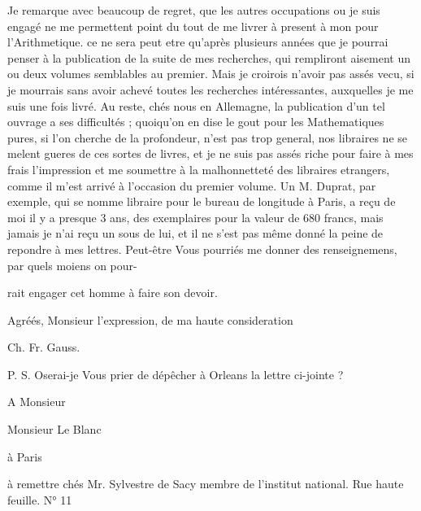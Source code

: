 \documentclass[11pt,a4paper]{article}
\begin{document}
Je remarque avec beaucoup de regret, que les autres occupations ou je suis
engagé ne me permettent point du tout de me livrer à present à mon
 pour l'Arithmetique. ce ne sera peut etre qu'après
plusieurs années que je pourrai penser à la publication de la suite de mes
recherches, qui rempliront aisement un ou deux volumes 
semblables au premier. Mais je croirois n'avoir pas assés vecu, si je mourrais
sans avoir achevé toutes les recherches intéressantes, \struck{\ill{}}
auxquelles je me suis une fois livré. Au reste, chés nous en Allemagne, la
publication d'un tel ouvrage a ses difficultés ; quoiqu'on en dise le gout
pour les Mathematiques pures, si l'on cherche de la profondeur, n'est pas trop
general, nos libraires ne se melent gueres de ces sortes de livres, et je ne
suis pas assés riche pour faire à mes frais l'impression et me soumettre à la
malhonnetteté des libraires etrangers, comme il m'est arrivé à l'occasion du
premier volume. Un M. Duprat, par exemple, qui se nomme libraire pour le bureau
de longitude à Paris, a reçu de moi il y a presque 3 ans, des exemplaires pour
la valeur de 680 francs, mais jamais je n'ai reçu un sous de lui, et il ne
s'est pas même donné la peine de repondre à mes lettres. Peut-être Vous
pourriés me donner des renseignemens, par quels moiens on pour-


rait engager cet homme à faire son devoir.

Agréés, Monsieur l'expression, de ma haute consideration

Ch. Fr. Gauss.

P. S. Oserai-je Vous prier de dépêcher à Orleans la lettre ci-jointe ?


A Monsieur

Monsieur Le Blanc

à Paris

à remettre chés Mr. Sylvestre de Sacy membre de l'institut national. Rue
haute feuille. N° 11
\end{document}
